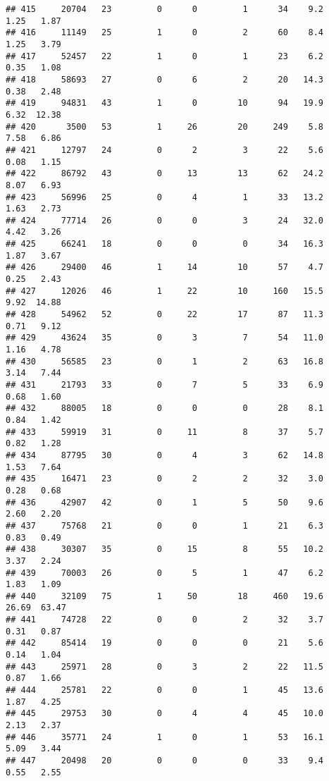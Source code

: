 \documentclass[
]{article}
\begin{document}
\begin{verbatim}
## 415     20704   23         0      0         1      34    9.2    1.25   1.87
## 416     11149   25         1      0         2      60    8.4    1.25   3.79
## 417     52457   22         1      0         1      23    6.2    0.35   1.08
## 418     58693   27         0      6         2      20   14.3    0.38   2.48
## 419     94831   43         1      0        10      94   19.9    6.32  12.38
## 420      3500   53         1     26        20     249    5.8    7.58   6.86
## 421     12797   24         0      2         3      22    5.6    0.08   1.15
## 422     86792   43         0     13        13      62   24.2    8.07   6.93
## 423     56996   25         0      4         1      33   13.2    1.63   2.73
## 424     77714   26         0      0         3      24   32.0    4.42   3.26
## 425     66241   18         0      0         0      34   16.3    1.87   3.67
## 426     29400   46         1     14        10      57    4.7    0.25   2.43
## 427     12026   46         1     22        10     160   15.5    9.92  14.88
## 428     54962   52         0     22        17      87   11.3    0.71   9.12
## 429     43624   35         0      3         7      54   11.0    1.16   4.78
## 430     56585   23         0      1         2      63   16.8    3.14   7.44
## 431     21793   33         0      7         5      33    6.9    0.68   1.60
## 432     88005   18         0      0         0      28    8.1    0.84   1.42
## 433     59919   31         0     11         8      37    5.7    0.82   1.28
## 434     87795   30         0      4         3      62   14.8    1.53   7.64
## 435     16471   23         0      2         2      32    3.0    0.28   0.68
## 436     42907   42         0      1         5      50    9.6    2.60   2.20
## 437     75768   21         0      0         1      21    6.3    0.83   0.49
## 438     30307   35         0     15         8      55   10.2    3.37   2.24
## 439     70003   26         0      5         1      47    6.2    1.83   1.09
## 440     32109   75         1     50        18     460   19.6   26.69  63.47
## 441     74728   22         0      0         2      32    3.7    0.31   0.87
## 442     85414   19         0      0         0      21    5.6    0.14   1.04
## 443     25971   28         0      3         2      22   11.5    0.87   1.66
## 444     25781   22         0      0         1      45   13.6    1.87   4.25
## 445     29753   30         0      4         4      45   10.0    2.13   2.37
## 446     35771   24         1      0         1      53   16.1    5.09   3.44
## 447     20498   20         0      0         0      33    9.4    0.55   2.55

\end{verbatim}
\end{document}
